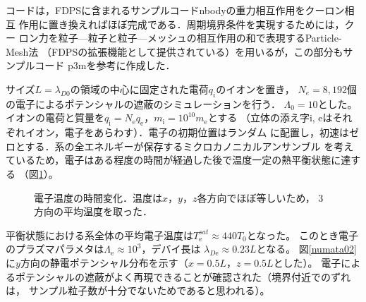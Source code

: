 \documentclass{jspf}            %
\begin{document}
コードは，FDPSに含まれるサンプルコードnbodyの重力相互作用をクーロン相互
作用に置き換えればほぼ完成である．周期境界条件を実現するためには，クー
ロン力を粒子—粒子と粒子—メッシュの相互作用の和で表現するParticle-Mesh法
（FDPSの拡張機能として提供されている）を用いるが，この部分もサンプルコード
p3mを参考に作成した．

サイズ$L=\lambda_{D0}$の領域の中心に固定された電荷$q_i$のイオンを置き，
$N_e=8,192$個の電子によるポテンシャルの遮蔽のシミュレーションを行う．
$\Lambda_0=10$とした。
イオンの電荷と質量を$q_{\mathrm{i}}=N_{\mathrm{e}} q_{\mathrm{e}}$，$m_{\mathrm{i}}=10^{10} m_{\mathrm{e}}$とする
（立体の添え字i, eはそれぞれイオン，電子をあらわす）．電子の初期位置はランダム
に配置し，初速はゼロとする．系の全エネルギーが保存するミクロカノニカルアンサンブル
を考えているため，電子はある程度の時間が経過した後で温度一定の熱平衡状態に達する
（図\ref{numata01}）。
\begin{figure}[h]
\begin{center}
\caption{電子温度の時間変化．温度は$x$，$y$，$z$各方向でほぼ等しいため，
3方向の平均温度を取った．}
\label{numata01}
\end{center}
\end{figure}
平衡状態における系全体の平均電子温度は$T_{\mathrm{e}}^{sat}\approx440T_0$となった。
このとき電子のプラズマパラメタは$\Lambda_{\mathrm{e}}\approx10^3$，デバイ長は
$\lambda_{D\mathrm{e}}\approx0.23L$となる。
図\ref{numata02}に$y$方向の静電ポテンシャル分布を示す（$x=0.5L$，$z=0.5L$とした）。
電子によるポテンシャルの遮蔽がよく再現できることが確認された（境界付近でのずれは，
サンプル粒子数が十分でないためであると思われる）。
\end{document}
